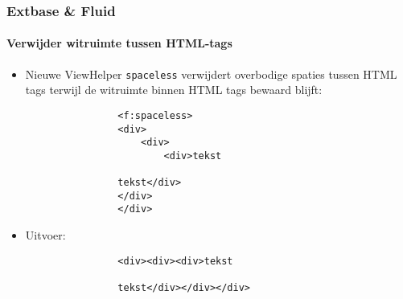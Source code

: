 \begin{frame}[fragile]
	\frametitle{Extbase \& Fluid}
	\framesubtitle{Verwijder witruimte tussen HTML-tags}

	\begin{itemize}

		\item Nieuwe ViewHelper \texttt{spaceless} verwijdert overbodige spaties tussen HTML tags
			terwijl de witruimte binnen HTML tags bewaard blijft:

			\begin{lstlisting}
				<f:spaceless>
				<div>
				    <div>
				        <div>tekst

				tekst</div>
				</div>
				</div>
			\end{lstlisting}

		\item Uitvoer:

			\begin{lstlisting}
				<div><div><div>tekst

				tekst</div></div></div>
			\end{lstlisting}

	\end{itemize}

\end{frame}


